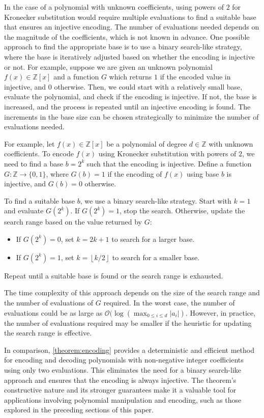 \documentclass[11pt,reqno]{article}
\theoremstyle{plain}
\theoremstyle{definition}
\newcommand{\floor}[1]{\left\lfloor #1 \right\rfloor}
\begin{document}
In the case of a polynomial with unknown coefficients, using powers of $2$ for Kronecker substitution would require multiple evaluations to find a suitable base that ensures an injective encoding. The number of evaluations needed depends on the magnitude of the coefficients, which is not known in advance. One possible approach to find the appropriate base is to use a binary search-like strategy, where the base is iteratively adjusted based on whether the encoding is injective or not. For example, suppose we are given an unknown polynomial $f(x) \in \mathbb{Z}[x]$ and a function $G$ which returns $1$ if the encoded value in injective, and $0$ otherwise. Then, we could start with a relatively small base, evaluate the polynomial, and check if the encoding is injective. If not, the base is increased, and the process is repeated until an injective encoding is found. The increments in the base size can be chosen strategically to minimize the number of evaluations needed.

For example, let $f(x) \in \mathbb{Z}[x]$ be a polynomial of degree $d \in \mathbb{Z}$ with unknown coefficients. To encode $f(x)$ using Kronecker substitution with powers of $2$, we need to find a base $b = 2^k$ such that the encoding is injective. Define a function $G: \mathbb{Z} \rightarrow \{0, 1\}$, where $G(b) = 1$ if the encoding of $f(x)$ using base $b$ is injective, and $G(b) = 0$ otherwise.

To find a suitable base $b$, we use a binary search-like strategy. Start with $k = 1$ and evaluate $G(2^k)$. If $G(2^k) = 1$, stop the search. Otherwise, update the search range based on the value returned by $G$:
\begin{itemize}
\item If $G(2^k) = 0$, set $k = 2k + 1$ to search for a larger base.
\item If $G(2^k) = 1$, set $k = \floor{k/2}$ to search for a smaller base.
\end{itemize}
Repeat until a suitable base is found or the search range is exhausted.

The time complexity of this approach depends on the size of the search range and the number of evaluations of $G$ required. In the worst case, the number of evaluations could be as large as $\mathcal{O}(\log(\max_{0 \leq i \leq d} |a_i|)$. However, in practice, the number of evaluations required may be smaller if the heuristic for updating the search range is effective.

In comparison, \cref{theorem:encoding} provides a deterministic and efficient method for encoding and decoding polynomials with non-negative integer coefficients using only two evaluations. This eliminates the need for a binary search-like approach and ensures that the encoding is always injective. The theorem's constructive nature and its stronger guarantees make it a valuable tool for applications involving polynomial manipulation and encoding, such as those explored in the preceding sections of this paper.

\newpage
\small
\begingroup
\raggedright


\endgroup
\end{document}

